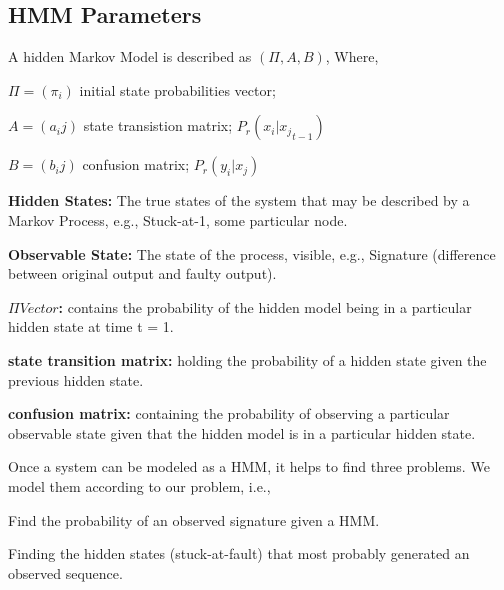 \subsection{HMM Parameters}

A hidden Markov Model is described as $(\Pi, A, B)$, Where,


\begin{center}

$\Pi = (\pi_i)$ initial state probabilities vector;

$A = (a_ij)$ state transistion matrix;  \hspace{0.3cm} $P_r(x_i | {x_j}_{t-1})$

$B = (b_ij)$ confusion matrix;     \hspace{0.3cm}        $P_r(y_i | x_j)$


\end{center}  

\textbf{Hidden States:} The true states of the system that may be described by a Markov Process, e.g., Stuck-at-1, some particular node.

\textbf{Observable State:} The state of the process, visible, e.g., Signature (difference between original output and faulty output).

\textbf{$\Pi Vector$:} contains the probability of the hidden model being in a particular hidden state at time t = 1.

\textbf{state transition matrix:}  holding the probability of a hidden state given the previous hidden state.

\textbf{confusion matrix:} containing the probability of observing a particular observable state given that the hidden model is in a particular hidden state. 



Once a system can be modeled as a HMM, it helps to find three problems. We model them according to our problem, i.e.,

\begin{tcolorbox}[width=\textwidth,colback={gray},title={Evaluation },colbacktitle=gray,coltitle=black]  

Find the probability of an observed signature given a HMM.  
\end{tcolorbox}


\begin{tcolorbox}[width=\textwidth,colback={gray},title={Decoding },colbacktitle=gray,coltitle=black]  

Finding the hidden states (stuck-at-fault) that most probably generated an observed sequence. 
\end{tcolorbox}

